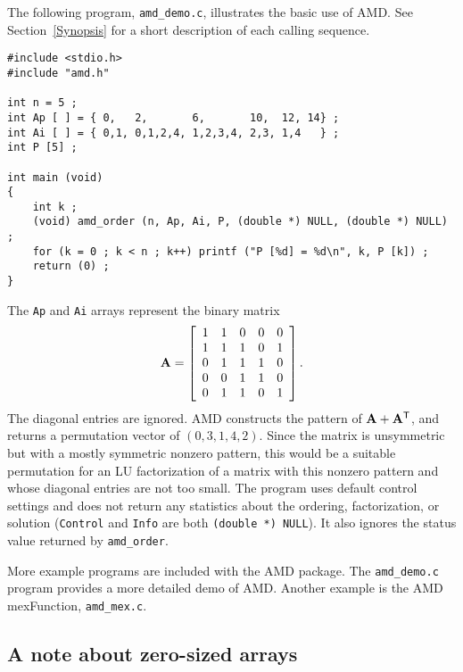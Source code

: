 \documentclass[11pt]{article}
\newcommand{\m}[1]{{\bf{#1}}}       %
\newcommand{\tr}{^{\sf T}}          %
\begin{document}
The following program, {\tt amd\_demo.c}, illustrates the basic use of AMD.
See Section~\ref{Synopsis} for a short description
of each calling sequence.

{\footnotesize
\begin{verbatim}
#include <stdio.h>
#include "amd.h"

int n = 5 ;
int Ap [ ] = { 0,   2,       6,       10,  12, 14} ;
int Ai [ ] = { 0,1, 0,1,2,4, 1,2,3,4, 2,3, 1,4   } ;
int P [5] ;

int main (void)
{
    int k ;
    (void) amd_order (n, Ap, Ai, P, (double *) NULL, (double *) NULL) ;
    for (k = 0 ; k < n ; k++) printf ("P [%d] = %d\n", k, P [k]) ;
    return (0) ;
}
\end{verbatim}
}

The {\tt Ap} and {\tt Ai} arrays represent the binary matrix
\[
\m{A} = \left[
\begin{array}{rrrrr}
 1 &  1 &  0 &  0 &  0 \\
 1 &  1 &  1 &  0 &  1 \\
 0 &  1 &  1 &  1 &  0 \\
 0 &  0 &  1 &  1 &  0 \\
 0 &  1 &  1 &  0 &  1 \\
\end{array}
\right].
\]
The diagonal entries are ignored.
%
AMD constructs the pattern of $\m{A}+\m{A}\tr$,
and returns a permutation vector of $(0, 3, 1, 4, 2)$.
%
Since the matrix is unsymmetric but with a mostly symmetric nonzero
pattern, this would be a suitable permutation for an LU factorization of a
matrix with this nonzero pattern and whose diagonal entries are not too small.
The program uses default control settings and does not return any statistics
about the ordering, factorization, or solution ({\tt Control} and {\tt Info}
are both {\tt (double *) NULL}).  It also ignores the status value returned by
{\tt amd\_order}.

More example programs are included with the AMD package.
The {\tt amd\_demo.c} program provides a more detailed demo of AMD.
Another example is the AMD mexFunction, {\tt amd\_mex.c}.

\subsection{A note about zero-sized arrays}
\end{document}
